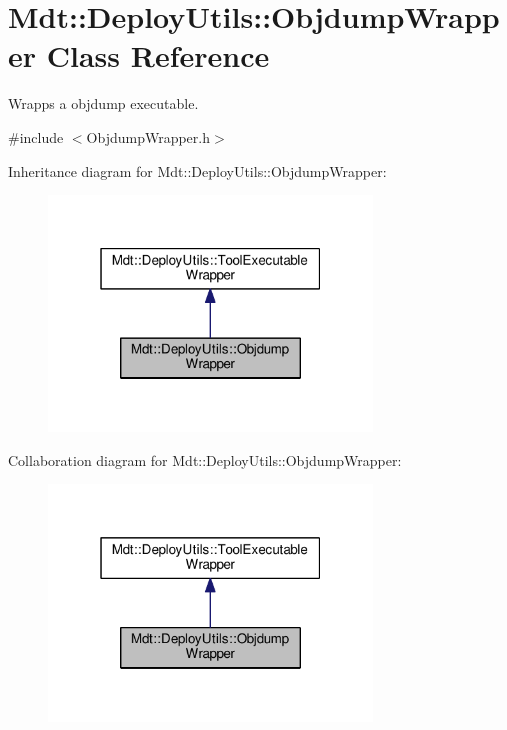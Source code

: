 \hypertarget{class_mdt_1_1_deploy_utils_1_1_objdump_wrapper}{}\section{Mdt\+:\+:Deploy\+Utils\+:\+:Objdump\+Wrapper Class Reference}
\label{class_mdt_1_1_deploy_utils_1_1_objdump_wrapper}


Wrapps a objdump executable.  




{\ttfamily \#include $<$Objdump\+Wrapper.\+h$>$}



Inheritance diagram for Mdt\+:\+:Deploy\+Utils\+:\+:Objdump\+Wrapper\+:\nopagebreak
\begin{figure}[H]
\begin{center}
\leavevmode
\includegraphics[width=244pt]{class_mdt_1_1_deploy_utils_1_1_objdump_wrapper__inherit__graph}
\end{center}
\end{figure}


Collaboration diagram for Mdt\+:\+:Deploy\+Utils\+:\+:Objdump\+Wrapper\+:\nopagebreak
\begin{figure}[H]
\begin{center}
\leavevmode
\includegraphics[width=244pt]{class_mdt_1_1_deploy_utils_1_1_objdump_wrapper__coll__graph}
\end{center}
\end{figure}
